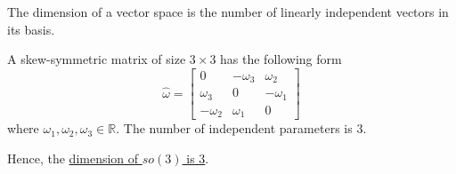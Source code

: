 The dimension of a vector space is the number of linearly independent vectors in its basis.

A skew-symmetric matrix of size \( 3 \times 3 \) has the following form
\begin{equation*}
    \hat \omega = \begin{bmatrix}
        0         & -\omega_3 & \omega_2  \\
        \omega_3  & 0         & -\omega_1 \\
        -\omega_2 & \omega_1  & 0
    \end{bmatrix}
\end{equation*}
where \( \omega_1, \omega_2, \omega_3 \in \mathbb{R} \).
The number of independent parameters is 3.

Hence, the \underline{dimension of \( so(3) \) is 3}.
